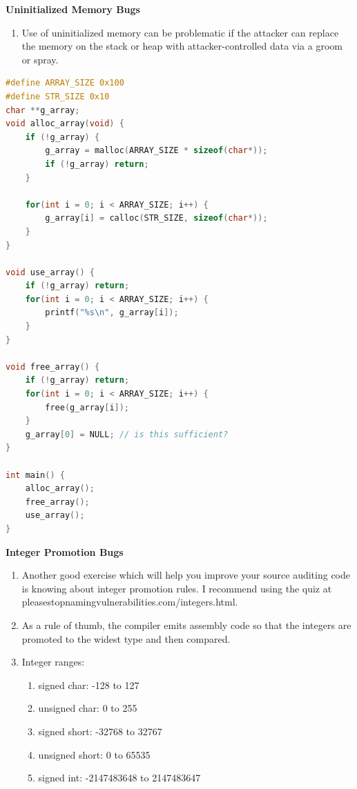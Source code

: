 \documentclass[12pt]{Training}
\begin{document}
\textbf{Uninitialized Memory Bugs}
\begin{enumerate}
    \item Use of uninitialized memory can be problematic if the attacker can replace the memory on the stack or heap with attacker-controlled data via a groom or spray.
\end{enumerate}
\begin{sectionbox}
\begin{lstlisting}[language=C, caption={Memory Used Uninitialized}]
#define ARRAY_SIZE 0x100
#define STR_SIZE 0x10
char **g_array;
void alloc_array(void) {
    if (!g_array) {
        g_array = malloc(ARRAY_SIZE * sizeof(char*));
        if (!g_array) return;
    }

    for(int i = 0; i < ARRAY_SIZE; i++) {
        g_array[i] = calloc(STR_SIZE, sizeof(char*));
    }
}

void use_array() {
    if (!g_array) return;
    for(int i = 0; i < ARRAY_SIZE; i++) {
        printf("%s\n", g_array[i]);
    }
}

void free_array() {
    if (!g_array) return;
    for(int i = 0; i < ARRAY_SIZE; i++) {
        free(g_array[i]);
    }
    g_array[0] = NULL; // is this sufficient?
}

int main() {
    alloc_array();
    free_array();
    use_array();
}
\end{lstlisting}
\end{sectionbox}


\textbf{Integer Promotion Bugs}
\begin{enumerate}
    \item Another good exercise which will help you improve your source auditing code is knowing about integer promotion rules. I recommend using the quiz at pleasestopnamingvulnerabilities.com/integers.html.
    \item As a rule of thumb, the compiler emits assembly code so that the integers are promoted to the widest type and then compared.
    \item Integer ranges:
        \begin{enumerate}
            \item signed char: -128 to 127
            \item unsigned char: 0 to 255
            \item signed short: -32768 to 32767
            \item unsigned short: 0 to 65535
            \item signed int: -2147483648 to 2147483647
        \end{enumerate}
\end{enumerate}
\end{document}

